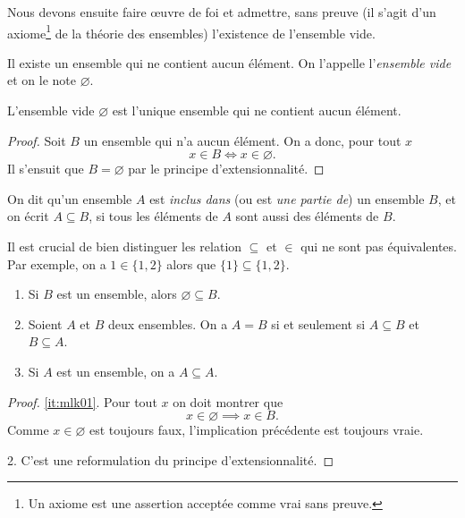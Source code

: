 \documentclass[french,course,oneside,theoremnosection]{lecture}
\begin{document}
Nous devons ensuite faire œuvre de foi et admettre, sans preuve (il s'agit d'un axiome\footnote{Un axiome est une assertion acceptée comme vrai sans preuve.} de la théorie des ensembles) l'existence de l'ensemble vide.

\begin{definition}
Il existe un ensemble qui ne contient aucun élément. On l'appelle l'\emph{ensemble vide} et on le note $\varnothing$.
\end{definition}

\begin{proposition}
L'ensemble vide $\varnothing$ est l'unique ensemble qui ne contient aucun élément.
\end{proposition}
\begin{proof}
Soit $B$ un ensemble qui n'a aucun élément. On a donc, pour tout $x$
\[
x \in B \iff x \in \varnothing.
\]
Il s'ensuit que $B=\varnothing$ par le principe d'extensionnalité.
\end{proof}

\begin{definition}
On dit qu'un ensemble $A$ est \emph{inclus dans} (ou est \emph{une partie de}) un ensemble $B$, et on écrit $A\subseteq B$, si tous les éléments de $A$ sont aussi des éléments de $B$.
\end{definition}

Il est crucial de bien distinguer les relation $\subseteq$ et $\in$ qui ne sont pas équivalentes. Par exemple, on a $1\in \{1, 2\}$ alors que $\{1\}\subseteq \{1,2\}$. 

\begin{proposition}\label{prop:mpo}
\begin{enumerate}[(1)]
\item\label{it:mlk01} Si $B$ est un ensemble, alors $\varnothing \subseteq B$.
\item\label{it:mlk02} Soient $A$ et $B$ deux ensembles. On a $A=B$ si et seulement si $A\subseteq B$ et $B \subseteq A$.
\item\label{it:mik03} Si $A$ est un ensemble, on a $A\subseteq A$.
\end{enumerate}
\end{proposition}
\begin{proof}
\ref{it:mlk01}. Pour tout $x$ on doit montrer que
\[
x\in \varnothing \implies x \in B.
\]
Comme $x\in \varnothing$ est toujours faux, l'implication précédente est toujours vraie.

2. C'est une reformulation du principe d'extensionnalité.
\end{proof}
\end{document}
